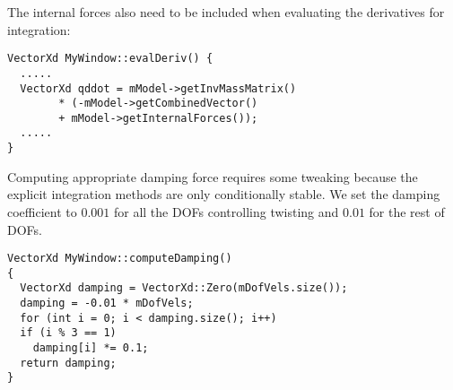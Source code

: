 The internal forces also need to be included when evaluating the
derivatives for integration:

\ttfamily
\begin{lstlisting}[caption=MyWindows.cpp]
VectorXd MyWindow::evalDeriv() {
  .....
  VectorXd qddot = mModel->getInvMassMatrix() 
        * (-mModel->getCombinedVector()
        + mModel->getInternalForces());
  .....
}
\end{lstlisting}
\rmfamily

Computing appropriate damping force requires some tweaking because the
explicit integration methods are only conditionally stable. We set the
damping coefficient to $0.001$ for all the DOFs controlling twisting
and $0.01$ for the rest of DOFs.

\ttfamily
\begin{lstlisting}[caption=MyWindow.cpp]
VectorXd MyWindow::computeDamping()
{
  VectorXd damping = VectorXd::Zero(mDofVels.size());
  damping = -0.01 * mDofVels;
  for (int i = 0; i < damping.size(); i++)
  if (i % 3 == 1)
    damping[i] *= 0.1;
  return damping;
}
\end{lstlisting}
\rmfamily
